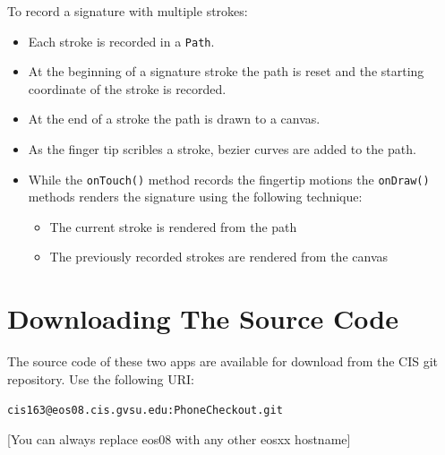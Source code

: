 \documentclass[11pt]{article} %
\begin{document}
To record a signature with multiple strokes:
\begin{itemize}
\item Each stroke is recorded in a \texttt{Path}. 
\item At the beginning of
   a signature stroke the path is reset and the starting coordinate
   of the stroke is recorded.
   
\item At the end of a stroke the path is drawn to a canvas.
    
\item As the finger tip scribles a stroke, bezier curves are added to the 
    path.
    
\item While the \texttt{onTouch()} method records the fingertip motions
   the \texttt{onDraw()} methods renders the signature using the
   following technique:
   \begin{itemize}
   \item The current stroke is rendered from the path
   \item The previously recorded strokes are rendered from the canvas
   \end{itemize}
\end{itemize}

\section{Downloading The Source Code}
The source code of these two apps are available for download from the CIS git repository.
Use the following URI:

\begin{center}
\texttt{cis163@eos08.cis.gvsu.edu:PhoneCheckout.git}
\end{center}
[You can always replace eos08 with any other eosxx hostname]
\end{document}
